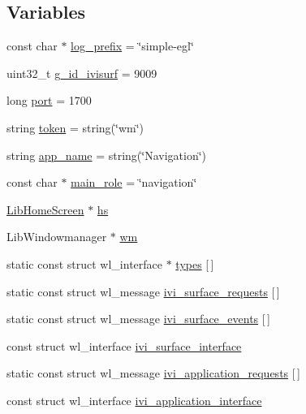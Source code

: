 \subsection*{Variables}
\begin{DoxyCompactItemize}
\item 
const char $\ast$ \hyperlink{simple-egl_8cpp_a894f18168fa25101d792262f59846938}{log\+\_\+prefix} = \char`\"{}simple-\/egl\char`\"{}
\item 
uint32\+\_\+t \hyperlink{simple-egl_8cpp_a28f56c9f01ed9f108201950645317cc9}{g\+\_\+id\+\_\+ivisurf} = 9009
\item 
long \hyperlink{simple-egl_8cpp_a300b6806fe6818927fe4df08f2398124}{port} = 1700
\item 
string \hyperlink{simple-egl_8cpp_a623ef6987ef3bd185c07b28b13e46d34}{token} = string(\char`\"{}wm\char`\"{})
\item 
string \hyperlink{simple-egl_8cpp_a0da928eccfc57d1dfadfd29d4ac4854c}{app\+\_\+name} = string(\char`\"{}Navigation\char`\"{})
\item 
const char $\ast$ \hyperlink{simple-egl_8cpp_a332251aa739a56836cd4fbf3ecbb8bb2}{main\+\_\+role} = \char`\"{}navigation\char`\"{}
\item 
\hyperlink{class_lib_home_screen}{Lib\+Home\+Screen} $\ast$ \hyperlink{simple-egl_8cpp_a529acbd1fed9d98a587edfa62309fa8d}{hs}
\item 
Lib\+Windowmanager $\ast$ \hyperlink{simple-egl_8cpp_ad1513698e07197206c290f94d7669d85}{wm}
\item 
static const struct wl\+\_\+interface $\ast$ \hyperlink{simple-egl_8cpp_aea3203db9e218d3e5d60bdb4ebe2fa1f}{types} \mbox{[}$\,$\mbox{]}
\item 
static const struct wl\+\_\+message \hyperlink{simple-egl_8cpp_ada80120c5590d2821da9babef808b98d}{ivi\+\_\+surface\+\_\+requests} \mbox{[}$\,$\mbox{]}
\item 
static const struct wl\+\_\+message \hyperlink{simple-egl_8cpp_ac848f4fbf712a9ba414272fa85577791}{ivi\+\_\+surface\+\_\+events} \mbox{[}$\,$\mbox{]}
\item 
const struct wl\+\_\+interface \hyperlink{simple-egl_8cpp_adf384de8d12d2edd7265ab85fd16b11c}{ivi\+\_\+surface\+\_\+interface}
\item 
static const struct wl\+\_\+message \hyperlink{simple-egl_8cpp_a21a39b7c6cf5f6d10a62a70b3ebc9bad}{ivi\+\_\+application\+\_\+requests} \mbox{[}$\,$\mbox{]}
\item 
const struct wl\+\_\+interface \hyperlink{simple-egl_8cpp_a769b65b7b0e834f732f1f45e835890d5}{ivi\+\_\+application\+\_\+interface}

\end{DoxyCompactItemize}
